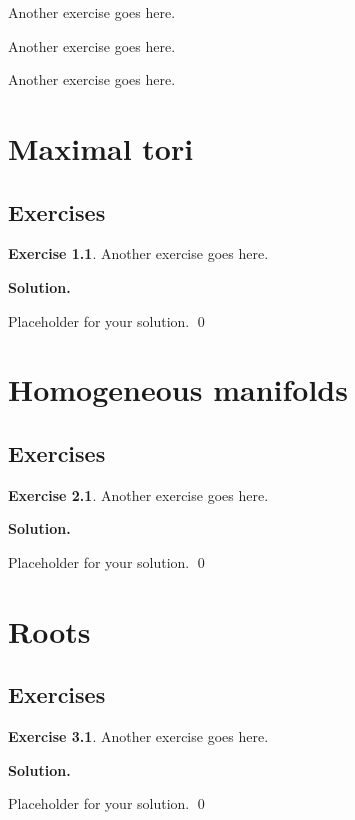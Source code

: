 \documentclass[12pt]{book}
\theoremstyle{definition}
\newtheorem{exercise}{Exercise}[chapter]
\newenvironment{solution}
{%
  \par\noindent\textbf{Solution.}\quad
}
{%
  \qed\par
}
\begin{document}
\begin{taggedexercise}[TODO]
  Another exercise goes here.
\end{taggedexercise}

\begin{taggedexercise}[TODO]
  Another exercise goes here.
\end{taggedexercise}

\begin{taggedexercise}[TODO]
  Another exercise goes here.
\end{taggedexercise}

\chapter{Maximal tori}
\section{Exercises}

\begin{exercise}
Another exercise goes here.
\end{exercise}

\begin{solution}
Placeholder for your solution.
\end{solution}

\chapter{Homogeneous manifolds}
\section{Exercises}

\begin{exercise}
Another exercise goes here.
\end{exercise}

\begin{solution}
Placeholder for your solution.
\end{solution}

\chapter{Roots}
\section{Exercises}

\begin{exercise}
Another exercise goes here.
\end{exercise}

\begin{solution}
Placeholder for your solution.
\end{solution}

\end{document}
